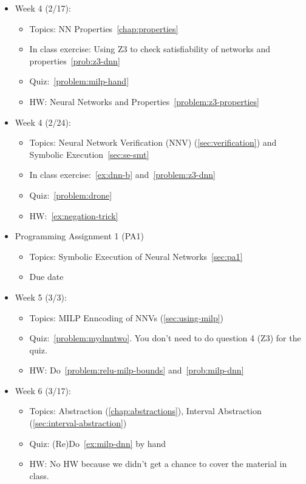 \documentclass[oneside,11pt,dvipsnames]{book}
\numberwithin{equation}{section}
\theoremstyle{definition}
\theoremstyle{remark}
\newcommand{\alert}[1]{{\color{red}{#1}}}
\begin{document}
\begin{itemize}
\begin{itemize}
    \end{itemize}


    \item Week 4 (2/17):
    \begin{itemize}
        \item Topics: NN Properties~\autoref{chap:properties} 
        \item In class exercise: Using Z3 to check satisfiability of networks and properties~\autoref{prob:z3-dnn}
        \item Quiz:~\autoref{problem:milp-hand}
        \item HW: Neural Networks and Properties~\autoref{problem:z3-properties}

    \end{itemize}

    \item Week 4 (2/24):
    \begin{itemize}
        \item Topics: Neural Network Verification (NNV) (\autoref{sec:verification}) and Symbolic Execution~\autoref{sec:se-smt}
        \item In class exercise:~\autoref{ex:dnn-b} and~\autoref{problem:z3-dnn}
        \item Quiz:~\autoref{problem:drone}
        \item HW:~\autoref{ex:negation-trick}
    \end{itemize}
       
    \item Programming Assignment 1 (PA1)
    \begin{itemize}
        \item Topics: Symbolic Execution of Neural Networks~\autoref{sec:pa1}
        \item Due date \alert{Monday March 17, 2026 11:59 PM}         
    \end{itemize}


    \item Week 5 (3/3):
    \begin{itemize}
        \item Topics: MILP Enncoding of NNVs (\autoref{sec:using-milp})        
        \item Quiz:~\autoref{problem:mydnntwo}. You don't need to do question 4 (Z3) for the quiz.
        \item HW: Do~\autoref{problem:relu-milp-bounds} and~\autoref{prob:milp-dnn}
    \end{itemize}

    \item Week 6 (3/17):
    \begin{itemize}
        \item Topics: Abstraction (\autoref{chap:abstractions}), Interval Abstraction  (\autoref{sec:interval-abstraction})        
        \item Quiz: (Re)Do~\autoref{ex:milp-dnn} by hand
        \item HW: No HW because we didn't get a chance to cover the material in class.
    \end{itemize}


\end{itemize}
\end{document}
